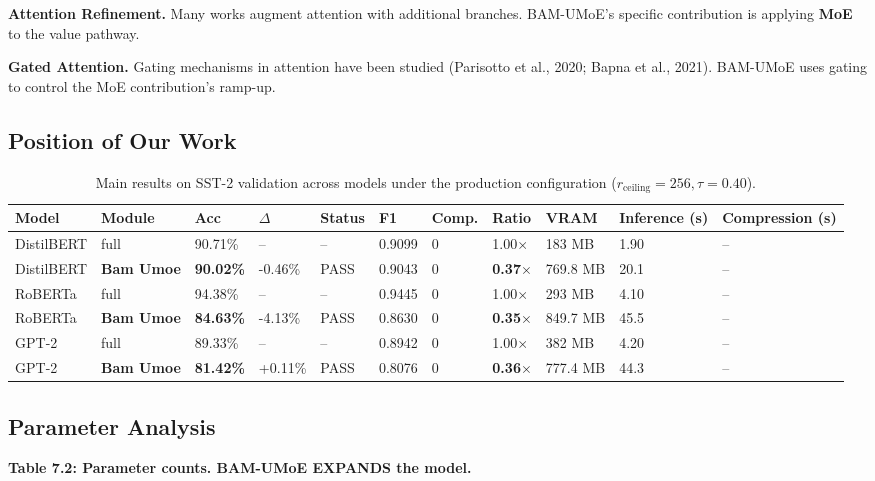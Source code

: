 \textbf{Attention Refinement.} Many works augment attention with additional 
branches. BAM-UMoE's specific contribution is applying \textbf{MoE} to the 
value pathway.

\textbf{Gated Attention.} Gating mechanisms in attention have been studied 
(Parisotto et al., 2020; Bapna et al., 2021). BAM-UMoE uses gating to 
control the MoE contribution's ramp-up.

\subsection{Position of Our Work}

\begin{table}[t]
\centering
\small
\begin{tabular}{lllllllllll}
\toprule
\textbf{Model} & \textbf{Module} & \textbf{Acc} & \textbf{$\Delta$} & \textbf{Status} & \textbf{F1} & \textbf{Comp.} & \textbf{Ratio} & \textbf{VRAM} & \textbf{Inference (s)} & \textbf{Compression (s)} \\
\midrule
DistilBERT & full & 90.71\% & -- & -- & 0.9099 & 0 & 1.00$\times$ & 183 MB & 1.90 & -- \\
DistilBERT & \textbf{Bam Umoe} & \textbf{90.02\%} & -0.46\% & PASS & 0.9043 & 0 & \textbf{0.37$\times$} & 769.8 MB & 20.1 & -- \\
RoBERTa & full & 94.38\% & -- & -- & 0.9445 & 0 & 1.00$\times$ & 293 MB & 4.10 & -- \\
RoBERTa & \textbf{Bam Umoe} & \textbf{84.63\%} & -4.13\% & PASS & 0.8630 & 0 & \textbf{0.35$\times$} & 849.7 MB & 45.5 & -- \\
GPT-2 & full & 89.33\% & -- & -- & 0.8942 & 0 & 1.00$\times$ & 382 MB & 4.20 & -- \\
GPT-2 & \textbf{Bam Umoe} & \textbf{81.42\%} & +0.11\% & PASS & 0.8076 & 0 & \textbf{0.36$\times$} & 777.4 MB & 44.3 & -- \\
\bottomrule
\end{tabular}
\caption{Main results on SST-2 validation across models under the production configuration ($r_{\mathrm{ceiling}}=256, \tau=0.40$).}
\label{tab:main_sst2}
\end{table}

\subsection{Parameter Analysis}

\textbf{Table 7.2: Parameter counts. BAM-UMoE EXPANDS the model.}

